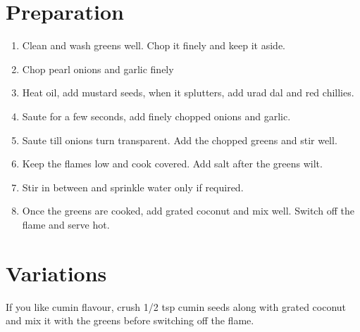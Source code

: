 \documentclass[12pt,a4paper]{article}
\begin{document}
\section*{Preparation}

\begin{enumerate}
    \item Clean and wash greens well. Chop it finely and keep it aside.
    \item Chop pearl onions and garlic finely 
    \item Heat oil, add mustard seeds, when it splutters, add urad dal and red chillies.
    \item Saute for a few seconds, add finely chopped onions and garlic.
    \item Saute till onions turn transparent. Add the chopped greens and stir well.
    \item Keep the flames low and cook covered. Add salt after the greens wilt.
    \item Stir in between and sprinkle water only if required.
    \item Once the greens are cooked, add grated coconut and mix well. Switch off the flame and serve hot.
\end{enumerate}
\section*{Variations}

If you like cumin flavour, crush 1/2 tsp cumin seeds along with grated coconut and mix it with the greens before switching off the flame.
\end{document}
